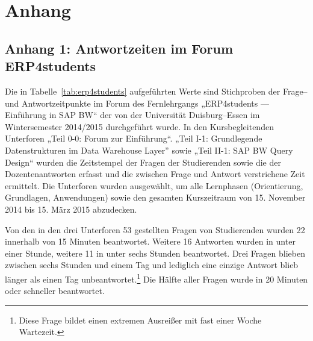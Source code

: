 \appendix
\section*{Anhang}


\subsection*{Anhang 1: Antwortzeiten im Forum ERP4students} %
\label{sub:antwortzeiten_im_forum_erp4students}

Die in Tabelle~\ref{tab:erp4students} aufgeführten Werte sind Stichproben der Frage– und Antwortzeitpunkte im Forum des Fernlehrgangs „ERP4students — Einführung in SAP BW“ der von der Universität Duisburg–Essen im Wintersemester 2014/2015 durchgeführt wurde. In den Kursbegleitenden Unterforen „Teil 0-0: Forum zur Einführung“. „Teil I-1: Grundlegende Datenstrukturen im Data Warehouse Layer” sowie „Teil II-1: SAP BW Query Design“ wurden die Zeitstempel der Fragen der Studierenden sowie die der Dozentenantworten erfasst und die zwischen Frage und Antwort verstrichene Zeit ermittelt. Die Unterforen wurden ausgewählt, um alle Lernphasen (Orientierung, Grundlagen, Anwendungen) sowie den gesamten Kurszeitraum von 15. November 2014 bis 15. März 2015 abzudecken.

Von den in den drei Unterforen 53 gestellten Fragen von Studierenden wurden 22 innerhalb von 15 Minuten beantwortet. Weitere 16 Antworten wurden in unter einer Stunde, weitere 11 in unter sechs Stunden beantwortet. Drei Fragen blieben zwischen sechs Stunden und einem Tag und lediglich eine einzige Antwort blieb länger als einen Tag unbeantwortet.\footnote{Diese Frage bildet einen extremen Ausreißer mit fast einer Woche Wartezeit.} Die Hälfte aller Fragen wurde in 20 Minuten oder schneller beantwortet.

